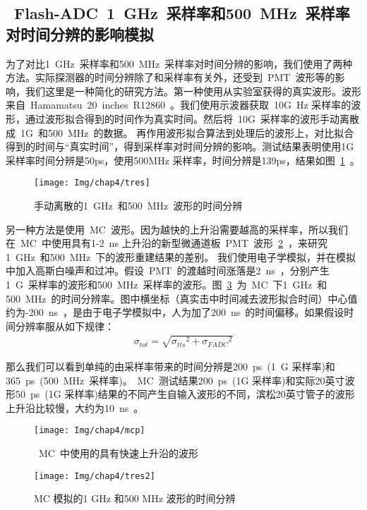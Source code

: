 \subsection{~Flash-ADC~1~GHz~采样率和500~MHz~采样率对时间分辨的影响模拟}
为了对比1~GHz~采样率和500~MHz~采样率对时间分辨的影响，我们使用了两种方法。实际探测器的时间分辨除了和采样率有关外，还受到~PMT~波形等的影响，我们这里是一种简化的研究方法。第一种使用从实验室获得的真实波形。波形来自~Hamamatsu~20~inches~R12860~。我们使用示波器获取~10G~Hz 采样率的波形，通过波形拟合得到的时间作为真实时间。然后将~10G~采样率的波形手动离散成~1G~和500~MHz~的数据。 再作用波形拟合算法到处理后的波形上，对比拟合得到的时间与``真实时间''，得到采样率对时间分辨的影响。测试结果表明使用1G采样率时间分辨是50ps，使用500MHz 采样率，时间分辨是139ps，结果如图~\ref{fig:tres}~。
  \begin{figure}[!htbp]
  \centering
   \texttt{[image: Img/chap4/tres]}
    \caption{手动离散的1~GHz~和500~MHz~波形的时间分辨 }
  \label{fig:tres}
\end{figure}

另一种方法是使用~MC~波形。因为越快的上升沿需要越高的采样率，所以我们在~MC~中使用具有1-2~ns 上升沿的新型微通道板~PMT~波形~\ref{fig:mcp}~，来研究1~GHz~和500~MHz~下的波形重建结果的差别。 我们使用电子学模拟，并在模拟中加入高斯白噪声和过冲。假设~PMT~的渡越时间涨落是2~ns~，分别产生1~G~采样率的波形和500~MHz~采样率的波形。图~\ref{fig:tres2}~为~MC~下1~GHz~和500~MHz~的时间分辨率。图中横坐标（真实击中时间减去波形拟合时间）中心值约为-200~ns~，是由于电子学模拟中，人为加了200~ns~的时间偏移。如果假设时间分辨率服从如下规律：
\begin{eqnarray}
\sigma_{tot}=\sqrt{{\sigma_{tts}}^2+{\sigma_{FADC}}^2}
\end{eqnarray}

那么我们可以看到单纯的由采样率带来的时间分辨是200~ps~(1~G 采样率)和365~ps~(500~MHz~采样率)。~MC~测试结果200~ps~(1G 采样率)和实际20英寸波形50~ps~(1G 采样率)结果的不同产生自输入波形的不同，滨松20英寸管子的波形上升沿比较慢，大约为10~ns~。
  \begin{figure}[!htbp]
  \centering
   \texttt{[image: Img/chap4/mcp]}
    \caption{~MC~中使用的具有快速上升沿的波形}
  \label{fig:mcp}
\end{figure}
  \begin{figure}[!htbp]
  \centering
   \texttt{[image: Img/chap4/tres2]}
    \caption{ MC 模拟的1 GHz 和500 MHz 波形的时间分辨 }
  \label{fig:tres2}
\end{figure}
